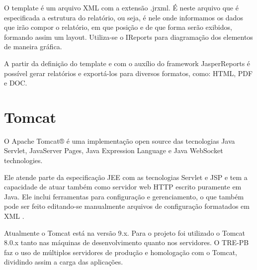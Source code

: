 O template é um arquivo XML com a extensão .jrxml. É neste arquivo que é especificada a estrutura do relatório, ou seja, é nele onde informamos os dados que irão compor o relatório, em que posição e de que forma serão exibidos, formando assim um layout. Utiliza-se o IReports para diagramação dos elementos de maneira gráfica.

A partir da definição do template e com o auxílio do framework JasperReports é possível gerar relatórios e exportá-los para diversos formatos, como: HTML, PDF e DOC.

\section{Tomcat}
\label{sec:embasamentoTeoricoTomcat}

O Apache Tomcat® é uma implementação open source das tecnologias Java Servlet, JavaServer Pages, Java Expression Language e Java WebSocket technologies.

Ele atende parte da especificação JEE com as tecnologias Servlet e JSP  e tem a capacidade de atuar também como servidor web HTTP escrito puramente em Java. Ele inclui ferramentas para configuração e gerenciamento, o que também pode ser feito editando-se manualmente arquivos de configuração formatados em XML \cite{WikipediaTomcat2018}.

Atualmente o Tomcat está na versão 9.x. Para o projeto foi utilizado o Tomcat 8.0.x tanto nas máquinas de desenvolvimento quanto nos servidores. O TRE-PB faz o uso de múltiplos servidores de produção e homologação com o Tomcat, dividindo assim a carga das aplicações. 

